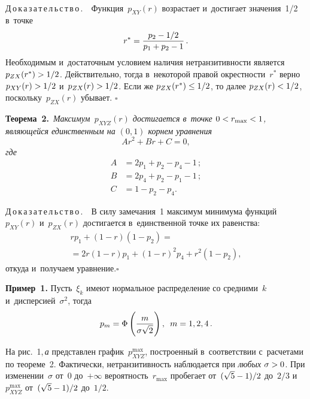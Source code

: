\begin{multicols}{2}
\begin{figure*} %
 \vspace*{1pt}
    \begin{center}  
  \mbox{%
 \epsfxsize=163mm 
 }
\end{center}
\vspace*{-9pt}
\end{figure*}


\noindent
Д\,о\,к\,а\,з\,а\,т\,е\,л\,ь\,с\,т\,в\,о\,.\ \
 Функция~$p_{XY}(r)$ возрастает и~достигает значения~1/2 в~точке
$$
r^*=\displaystyle\frac{\displaystyle p_2-1/2\mathstrut}{\displaystyle p_1+p_2-1\mathstrut}\,.
$$
Необходимым и~достаточным условием наличия нетранзитивности является $p_{ZX}(r^*)\hm>1/2$.
Действительно, тогда в~некоторой правой окрест\-ности~$r^*$ верно $p_{XY}(r)\hm>1/2$ 
и~$p_{ZX}(r)\hm>1/2$. Если же $p_{ZX}(r^*)\hm\le 1/2$, то далее $p_{ZX}(r)\hm<1/2$, 
поскольку~$p_{ZX}(r)$ убывает.\hfill
$\square$

\smallskip

\noindent
\textbf{Теорема~2.}\ \textit{Максимум~$p_{XYZ}(r)$ достигается в~точке 
$0\hm<r_{\max}\hm<1$, являющейся
единственным на $(0,1)$ корнем уравнения}
$$
Ar^2+Br+C=0,
$$
\textit{где}
\begin{align*}
A&=2p_1+p_2-p_4-1\,;\\
B&=2p_4+p_2-p_1-1\,;\\ 
C&=1-p_2-p_4.
\end{align*}


\noindent
Д\,о\,к\,а\,з\,а\,т\,е\,л\,ь\,с\,т\,в\,о\,.\ \
В силу замечания~1
максимум минимума функций~$p_{XY}(r)$ и~$p_{ZX}(r)$ достигается в~единственной 
точке их равенства:
\begin{multline*}
rp_1+(1-r)(1-p_2)={}\\
{}=2r(1-r)p_1+(1-r)^2p_4+r^2(1-p_2),
\end{multline*}
откуда и~получаем уравнение.\hfill$\square$

\smallskip

\noindent
\textbf{Пример~1.} Пусть~$\xi_k$ имеют нормальное распределение со средними~$k$ 
и~дисперсией~$\sigma^2$, тогда
$$
p_m=\Phi\left(\displaystyle\frac{\displaystyle m\mathstrut}{\displaystyle \sigma\sqrt{2}\mathstrut}\right),\enskip m=1, 2, 4\,.
$$

На рис.~1,\,\textit{а} пред\-став\-лен график~$p_{XYZ}^{\max}$, построенный в~соответствии с~расчетами 
по теореме~2.
Фактически, нетранзитивность наблюдается при \textit{любых} $\sigma\hm>0$. 
При изменении~$\sigma$ от~$0$ до~$+\infty$ вероятность~$r_{\max}$ 
пробегает от~$(\sqrt{5}\hm-1)/2$ до~$2/3$ и~$p_{XYZ}^{\max}$ от~$(\sqrt{5}\hm-1)/2$
до~$1/2$.




\end{multicols}
